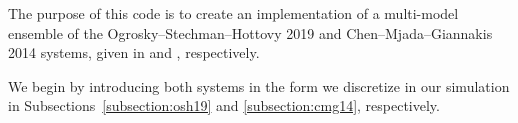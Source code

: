 The purpose of this code is to create an implementation of a multi-model ensemble of the Ogrosky--Stechman--Hottovy 2019 and Chen--Mjada--Giannakis 2014 systems, given in \cite{Ogrosky19} and \cite{Chen14}, respectively. 

We begin by introducing both systems in the form we discretize in our simulation in Subsections~\ref{subsection:osh19} and \ref{subsection:cmg14}, respectively.

